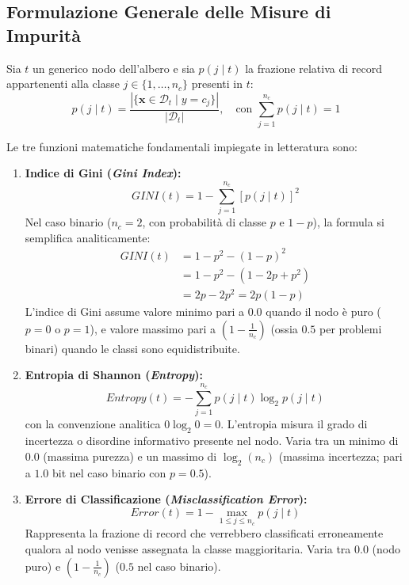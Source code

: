 \FloatBarrier
\subsection{Formulazione Generale delle Misure di Impurità}
\label{subsec:dm-impurity-formulations}

Sia $t$ un generico nodo dell'albero e sia $p(j \mid t)$ la frazione relativa di record appartenenti alla classe $j \in \{1, \dots, n_c\}$ presenti in $t$:
\begin{equation}
    p(j \mid t) = \frac{|\{\mathbf{x} \in \mathcal{D}_t \mid y = c_j\}|}{|\mathcal{D}_t|}, \quad \text{con } \sum_{j=1}^{n_c} p(j \mid t) = 1
\end{equation}

Le tre funzioni matematiche fondamentali impiegate in letteratura sono:
\begin{enumerate}
    \item \textbf{Indice di Gini (\textit{Gini Index}):}
    \begin{equation}
        GINI(t) = 1 - \sum_{j=1}^{n_c} [p(j \mid t)]^2
    \end{equation}
    Nel caso binario ($n_c = 2$, con probabilità di classe $p$ e $1-p$), la formula si semplifica analiticamente:
    \begin{align}
        GINI(t) &= 1 - p^2 - (1-p)^2 \nonumber \\
        &= 1 - p^2 - (1 - 2p + p^2) \nonumber \\
        &= 2p - 2p^2 = 2p(1-p)
    \end{align}
    L'indice di Gini assume valore minimo pari a $0.0$ quando il nodo è puro ($p=0$ o $p=1$), e valore massimo pari a $\left(1 - \frac{1}{n_c}\right)$ (ossia $0.5$ per problemi binari) quando le classi sono equidistribuite.
    
    \item \textbf{Entropia di Shannon (\textit{Entropy}):}
    \begin{equation}
        Entropy(t) = -\sum_{j=1}^{n_c} p(j \mid t) \log_2 p(j \mid t)
    \end{equation}
    con la convenzione analitica $0 \log_2 0 = 0$. L'entropia misura il grado di incertezza o disordine informativo presente nel nodo. Varia tra un minimo di $0.0$ (massima purezza) e un massimo di $\log_2(n_c)$ (massima incertezza; pari a $1.0$ bit nel caso binario con $p = 0.5$).
    
    \item \textbf{Errore di Classificazione (\textit{Misclassification Error}):}
    \begin{equation}
        Error(t) = 1 - \max_{1 \le j \le n_c} p(j \mid t)
    \end{equation}
    Rappresenta la frazione di record che verrebbero classificati erroneamente qualora al nodo venisse assegnata la classe maggioritaria. Varia tra $0.0$ (nodo puro) e $\left(1 - \frac{1}{n_c}\right)$ ($0.5$ nel caso binario).
\end{enumerate}

